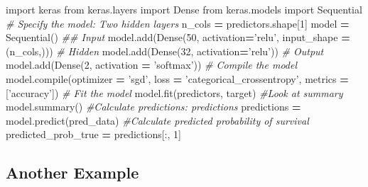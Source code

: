 \documentclass[]{book}
\newenvironment{Shaded}{\begin{snugshade}}{\end{snugshade}}
\newcommand{\DecValTok}[1]{\textcolor[rgb]{0.00,0.00,0.81}{#1}}
\newcommand{\StringTok}[1]{\textcolor[rgb]{0.31,0.60,0.02}{#1}}
\newcommand{\ImportTok}[1]{#1}
\newcommand{\CommentTok}[1]{\textcolor[rgb]{0.56,0.35,0.01}{\textit{#1}}}
\newcommand{\OperatorTok}[1]{\textcolor[rgb]{0.81,0.36,0.00}{\textbf{#1}}}
\newcommand{\BuiltInTok}[1]{#1}
\newcommand{\NormalTok}[1]{#1}
\theoremstyle{definition}
\theoremstyle{definition}
\theoremstyle{definition}
\theoremstyle{remark}
\begin{document}
\begin{Shaded}
\begin{Highlighting}[]
\ImportTok{import}\NormalTok{ keras}
\ImportTok{from}\NormalTok{ keras.layers }\ImportTok{import}\NormalTok{ Dense}
\ImportTok{from}\NormalTok{ keras.models }\ImportTok{import}\NormalTok{ Sequential}
\CommentTok{# Specify the model: Two hidden layers}
\NormalTok{n_cols }\OperatorTok{=}\NormalTok{ predictors.shape[}\DecValTok{1}\NormalTok{]}
\NormalTok{model }\OperatorTok{=}\NormalTok{ Sequential()}
\CommentTok{## Input}
\NormalTok{model.add(Dense(}\DecValTok{50}\NormalTok{, activation}\OperatorTok{=}\StringTok{'relu'}\NormalTok{, input_shape }\OperatorTok{=}\NormalTok{ (n_cols,)))}
\CommentTok{# Hidden}
\NormalTok{model.add(Dense(}\DecValTok{32}\NormalTok{, activation}\OperatorTok{=}\StringTok{'relu'}\NormalTok{))}
\CommentTok{# Output}
\NormalTok{model.add(Dense(}\DecValTok{2}\NormalTok{, activation }\OperatorTok{=} \StringTok{'softmax'}\NormalTok{))}
\CommentTok{# Compile the model}
\NormalTok{model.}\BuiltInTok{compile}\NormalTok{(optimizer }\OperatorTok{=} \StringTok{'sgd'}\NormalTok{, loss }\OperatorTok{=} \StringTok{'categorical_crossentropy'}\NormalTok{, metrics }\OperatorTok{=}\NormalTok{ [}\StringTok{'accuracy'}\NormalTok{])}
\CommentTok{# Fit the model}
\NormalTok{model.fit(predictors, target)}
\CommentTok{#Look at summary}
\NormalTok{model.summary()}
\CommentTok{#Calculate predictions: predictions}
\NormalTok{predictions }\OperatorTok{=}\NormalTok{ model.predict(pred_data)}
\CommentTok{#Calculate predicted probability of survival}
\NormalTok{predicted_prob_true }\OperatorTok{=}\NormalTok{ predictions[:, }\DecValTok{1}\NormalTok{]}
\end{Highlighting}
\end{Shaded}

\subsection{Another Example}\label{another-example}
\end{document}
